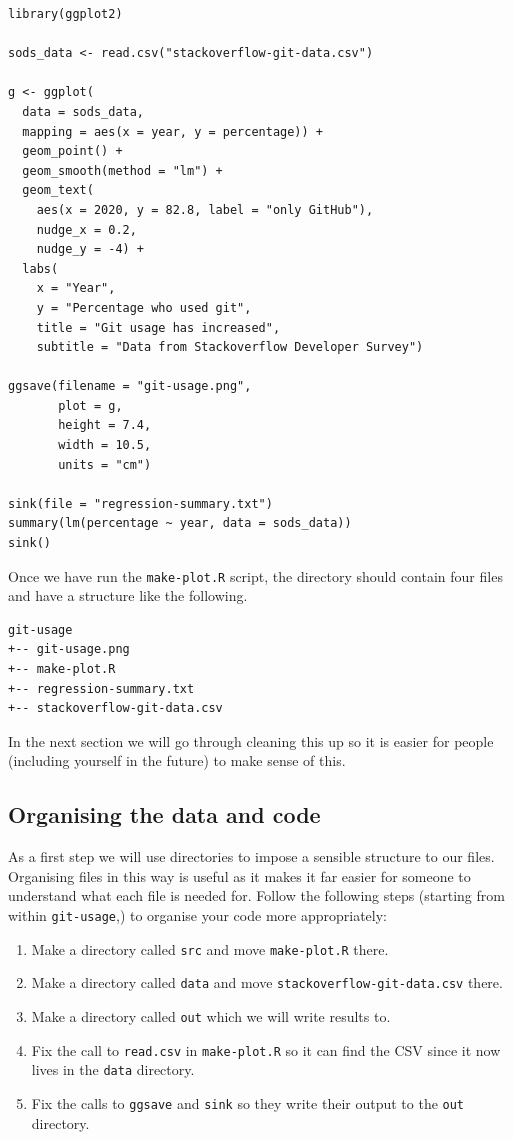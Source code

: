 \documentclass[11pt,onecolumn]{scrartcl}
\begin{document}
\lstset{language=r,label= ,caption= ,captionpos=b,numbers=none}
\begin{lstlisting}
library(ggplot2)

sods_data <- read.csv("stackoverflow-git-data.csv")

g <- ggplot(
  data = sods_data,
  mapping = aes(x = year, y = percentage)) +
  geom_point() +
  geom_smooth(method = "lm") +
  geom_text(
    aes(x = 2020, y = 82.8, label = "only GitHub"),
    nudge_x = 0.2,
    nudge_y = -4) +
  labs(
    x = "Year",
    y = "Percentage who used git",
    title = "Git usage has increased",
    subtitle = "Data from Stackoverflow Developer Survey")

ggsave(filename = "git-usage.png",
       plot = g,
       height = 7.4,
       width = 10.5,
       units = "cm")

sink(file = "regression-summary.txt")
summary(lm(percentage ~ year, data = sods_data))
sink()
\end{lstlisting}

Once we have run the \texttt{make-plot.R} script, the directory should contain four files
and have a structure like the following.

\begin{verbatim}
git-usage
+-- git-usage.png
+-- make-plot.R
+-- regression-summary.txt
+-- stackoverflow-git-data.csv
\end{verbatim}

In the next section we will go through cleaning this up so it is easier for
people (including yourself in the future) to make sense of this.

\subsection{Organising the data and code}
\label{sec:org6f95efd}

As a first step we will use directories to impose a sensible structure to our
files. Organising files in this way is useful as it makes it far easier for
someone to understand what each file is needed for. Follow the following steps
(starting from within \texttt{git-usage},) to organise your code more appropriately:

\begin{enumerate}
\item Make a directory called \texttt{src} and move \texttt{make-plot.R} there.
\item Make a directory called \texttt{data} and move \texttt{stackoverflow-git-data.csv} there.
\item Make a directory called \texttt{out} which we will write results to.
\item Fix the call to \texttt{read.csv} in \texttt{make-plot.R} so it can find the CSV since it
now lives in the \texttt{data} directory.
\item Fix the calls to \texttt{ggsave} and \texttt{sink} so they write their output to the \texttt{out}
directory.
\end{enumerate}
\end{document}
